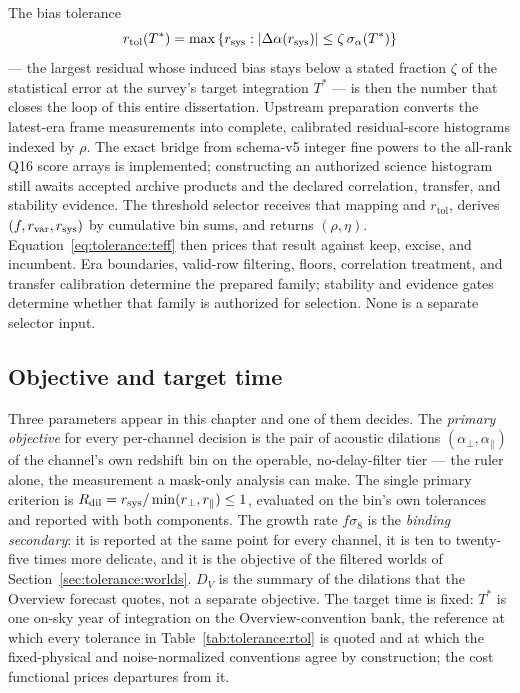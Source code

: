 The bias tolerance
\begin{equation}
\label{eq:tolerance:rtol}
r_{\text{tol}}(T^\ast) = \max \left\{ r_{\rm sys} : \left| \Delta\alpha(r_{\rm sys}) \right| \le \zeta\, \sigma_\alpha(T^\ast) \right\}
\end{equation}
--- the largest residual whose induced bias stays below a stated fraction $\zeta$ of the statistical error at the survey's target integration $T^\ast$ --- is then the number that closes the loop of this entire dissertation.  Upstream preparation converts the latest-era frame measurements into complete, calibrated residual-score histograms indexed by $\rho$.  The exact bridge from schema-v5 integer fine powers to the all-rank Q16 score arrays is implemented; constructing an authorized science histogram still awaits accepted archive products and the declared correlation, transfer, and stability evidence.  The threshold selector receives that mapping and $r_{\text{tol}}$, derives $(f,r_{\rm var},r_{\rm sys})$ by cumulative bin sums, and returns $(\rho,\eta)$.  Equation~\eqref{eq:tolerance:teff} then prices that result against keep, excise, and incumbent.  Era boundaries, valid-row filtering, floors, correlation treatment, and transfer calibration determine the prepared family; stability and evidence gates determine whether that family is authorized for selection. None is a separate selector input.

\subsection*{Objective and target time}

Three parameters appear in this chapter and one of them decides. The
\emph{primary objective} for every per-channel decision is the pair of acoustic
dilations $(\alpha_\perp, \alpha_\parallel)$ of the channel's own redshift bin
on the operable, no-delay-filter tier --- the ruler alone, the measurement a
mask-only analysis can make. The single primary criterion is $R_{\rm dil} = r_{\rm sys}/\min(r_{\perp}, r_{\parallel}) \le 1$,
evaluated on the bin's own tolerances and reported with both components.
The growth rate $f\sigma_8$ is the \emph{binding
secondary}: it is reported at the same point for every channel, it is ten to
twenty-five times more delicate, and it is the objective of the filtered
worlds of Section~\ref{sec:tolerance:worlds}. $D_V$ is the summary of the
dilations that the Overview forecast quotes, not a separate objective. The
target time is fixed: $T^\ast$ is one on-sky year of integration on the
Overview-convention bank, the reference at which every tolerance in
Table~\ref{tab:tolerance:rtol} is quoted and at which the fixed-physical and
noise-normalized conventions agree by construction; the cost functional prices
departures from it.

